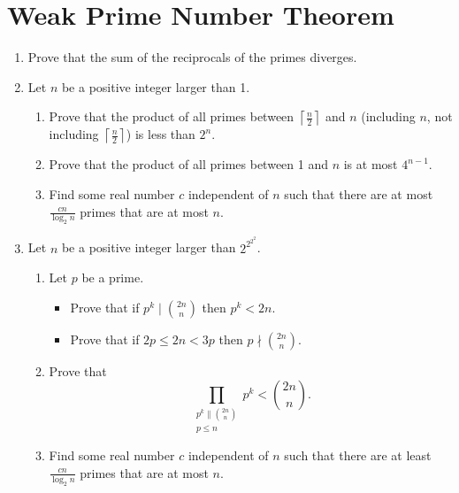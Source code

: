 \documentclass{article}
\begin{document}
\section{Weak Prime Number Theorem}
\begin{enumerate}
  \item Prove that the sum of the reciprocals of the primes diverges.
  \item
    Let $n$ be a positive integer larger than 1.
    \begin{enumerate}
      \item Prove that the product of all primes between $\left\lceil\frac
        n2\right\rceil$ and $n$
        (including $n$, not including $\left\lceil\frac n2\right\rceil$)
        is less than
        $2^n$.
      \item Prove that the product of all primes between 1 and $n$ is at most
        $4^{n-1}$.
      \item Find some real number $c$ independent of $n$ such that there are at
        most $\frac{cn}{\log_2 n}$ primes that are at most $n$.
    \end{enumerate}
  \item 
    Let $n$ be a positive integer larger than $2^{2^{2^2}}$.
    \begin{enumerate}
      \item Let $p$ be a prime.
        \begin{itemize}
          \item Prove that if $p^k\mid\binom{2n}n$ then $p^k<
            2n$.
          \item Prove that if $2p\le 2n< 3p$ then $p\nmid\binom{2n}n$.
        \end{itemize}
      \item Prove that 
        \[\prod_{\substack{p^k\|\binom{2n}n\\ p\le n}}p^k<\binom{2n}n.\]
      \item Find some real number $c$ independent of $n$ such that there are at
        least $\frac{cn}{\log_2 n}$ primes that are at most $n$.
    \end{enumerate} 
\end{enumerate}
\end{document}
